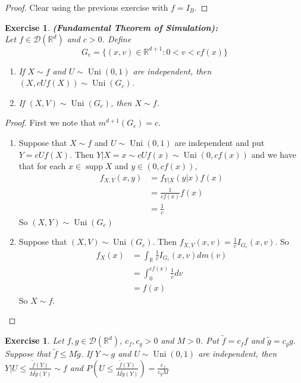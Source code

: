\documentclass[12pt]{amsart}
\newtheorem{ex}[thm]{Exercise}
\newcommand{\R}{\mathbb{R}}
\newcommand{\MD}{\mathcal{D}}
\DeclareMathOperator{\supp}{supp}
\DeclareMathOperator{\uni}{Uni}
\begin{document}
	\begin{proof}
		Clear using the previous exercise with $f = I_B$.
	\end{proof}
	
	\begin{ex}\textbf{(Fundamental Theorem of Simulation):} \\
		Let $f \in \MD(\R^d)$ and $c > 0$. Define $$G_c = \{(x,v) \in \R^{d+1}: 0< v < cf(x)\}$$ 
		\begin{enumerate}
			\item If $X \sim f$ and $U \sim \uni(0,1)$  are independent, then $(X, cUf(X)) \sim \uni(G_c)$.
			\item If $(X, V) \sim \uni(G_c)$, then $X \sim f$.
		\end{enumerate}
	\end{ex}

	\begin{proof} First we note that $m^{d+1}(G_c) = c$. 
		\begin{enumerate}
			\item Suppose that $X \sim f$ and $U \sim \uni(0,1)$ are independent and put $Y = cUf(X)$. Then $Y| X= x \sim cUf(x) \sim \uni(0, cf(x))$ and we have that for each $x \in \supp X$ and $y \in (0, cf(x))$,
			\begin{align*}
				f_{X, Y}(x,y) 
				&= f_{Y|X}(y| x) f(x) \\
				&= \frac{1}{c f(x)}f(x) \\
				&= \frac{1}{c}
			\end{align*}
			So $(X, Y) \sim \uni(G_c)$\\
			\item Suppose that $(X, V) \sim \uni(G_c)$. Then $f_{X,V}(x,v) = \frac{1}{c} I_{G_c}(x,v)$. So 
			\begin{align*}
				f_X(x) 
				&= \int_{\R} \frac{1}{c}I_{G_c}(x,v) dm(v) \\ 
				&= \int_{0}^{cf(x)} \frac{1}{c}dv \\
				&= f(x) 
			\end{align*}
			So $X \sim f$.
		\end{enumerate}
	\end{proof}

	\begin{ex}
		Let $f, g \in \MD(\R^d)$, $c_f,c_g>0$ and $M > 0$. Put $\tilde{f} = c_f f$ and $\tilde{g} = c_g g$. Suppose that $\tilde{f} \leq M \tilde{g}$. If $Y \sim g$ and $U \sim \uni(0,1)$ are independent, then $Y|U \leq \frac{\tilde{f}(Y)}{M\tilde{g}(Y)} \sim f$ and $P ( U \leq \frac{\tilde{f}(Y)}{M\tilde{g}(Y)} ) = \frac{c_f}{c_gM}$ 
	\end{ex}
\end{document}
